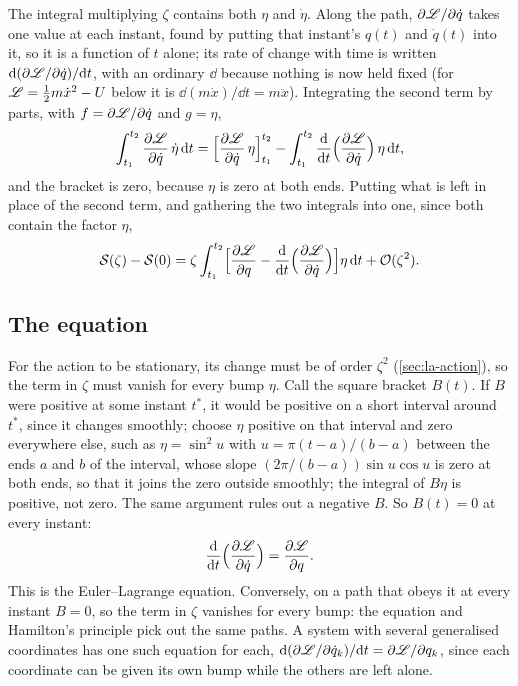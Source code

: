 The integral multiplying $\zeta$ contains both $\eta$ and $\dot\eta$. Along
the path, $\partial\mathscr{L}/\partial\dot{q}$ takes one value at each instant,
found by putting that instant's $q(t)$ and $\dot{q}(t)$ into it, so it is
a function of $t$ alone; its rate of change with time is written
$\mathrm{d}(\partial\mathscr{L}/\partial\dot{q})/\mathrm{d} t$, with an ordinary $\dd$
because nothing is now held fixed (for $\mathscr{L} = \frac12 m\dot{x}^2 - U$
below it is $\dd(m\dot{x})/\dd t = m\ddot{x}$). Integrating the second
term by parts, with $f = \partial\mathscr{L}/\partial\dot{q}$ and $g = \eta$,
\begin{equation*}
   \int_{t_1}^{t_2}\frac{\partial\mathscr{L}}{\partial\dot{q}}\,\dot\eta\,\mathrm{d} t
   = \Bigl[\frac{\partial\mathscr{L}}{\partial\dot{q}}\,\eta\Bigr]_{t_1}^{t_2}
   - \int_{t_1}^{t_2}\frac{\mathrm{d}}{\mathrm{d} t}\Bigl(\frac{\partial\mathscr{L}}
   {\partial\dot{q}}\Bigr)\,\eta\,\mathrm{d} t ,
\end{equation*}
and the bracket is zero, because $\eta$ is zero at both ends. Putting what
is left in place of the second term, and gathering the two integrals into
one, since both contain the factor $\eta$,
\begin{equation*}
   \mathcal{S}(\zeta) - \mathcal{S}(0) = \zeta\int_{t_1}^{t_2}\Bigl[\frac{\partial\mathscr{L}}
   {\partial q} - \frac{\mathrm{d}}{\mathrm{d} t}\Bigl(\frac{\partial\mathscr{L}}
   {\partial\dot{q}}\Bigr)\Bigr]\eta\,\mathrm{d} t + \mathcal{O}(\zeta^2) .
\end{equation*}

\subsection*{The equation}

For the action to be stationary, its change must be of order $\zeta^2$
(\cref{sec:la-action}), so the term in $\zeta$ must vanish for every bump
$\eta$. Call the square bracket $B(t)$. If $B$ were positive at
some instant $t^*$, it would be positive on a short interval around
$t^*$, since it changes smoothly; choose $\eta$ positive on that interval
and zero everywhere else, such as $\eta = \sin^2 u$ with $u = \pi(t -
a)/(b - a)$ between the ends $a$ and $b$ of the interval, whose slope
$(2\pi/(b - a))\sin u\cos u$ is zero at both ends, so that it joins the
zero outside smoothly; the integral of $B\eta$ is positive, not
zero. The same argument rules out a negative $B$. So $B(t) = 0$ at every
instant:
\begin{equation}
   \frac{\mathrm{d}}{\mathrm{d} t}\Bigl(\frac{\partial\mathscr{L}}{\partial\dot{q}}\Bigr)
   = \frac{\partial\mathscr{L}}{\partial q} .
   \label{eq:la-euler}
\end{equation}
This is the Euler--Lagrange equation. Conversely, on a path that obeys it
at every instant $B = 0$, so the term in $\zeta$ vanishes for every bump:
the equation and Hamilton's principle pick out the same paths. A system
with several generalised coordinates has one such equation for each, $\mathrm{d}(\partial\mathscr{L}/\partial
\dot{q}_k)/\mathrm{d} t = \partial\mathscr{L}/\partial q_k$, since each coordinate can
be given its own bump while the others are left alone.

